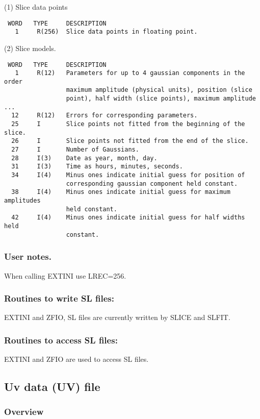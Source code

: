 (1) Slice data points

\begin{verbatim}
 WORD   TYPE     DESCRIPTION
   1     R(256)  Slice data points in floating point.
\end{verbatim}

(2) Slice models.

\begin{verbatim}
 WORD   TYPE     DESCRIPTION
   1     R(12)   Parameters for up to 4 gaussian components in the order
                 maximum amplitude (physical units), position (slice
                 point), half width (slice points), maximum amplitude ...
  12     R(12)   Errors for corresponding parameters.
  25     I       Slice points not fitted from the beginning of the slice.
  26     I       Slice points not fitted from the end of the slice.
  27     I       Number of Gaussians.
  28     I(3)    Date as year, month, day.
  31     I(3)    Time as hours, minutes, seconds.
  34     I(4)    Minus ones indicate initial guess for position of
                 corresponding gaussian component held constant.
  38     I(4)    Minus ones indicate initial guess for maximum amplitudes
                 held constant.
  42     I(4)    Minus ones indicate initial guess for half widths held
                 constant.
\end{verbatim}
\subsubsection{User notes.}
     When calling EXTINI use LREC=256.
 
 
\subsubsection{ Routines to write SL files:}
     EXTINI and ZFIO,  SL files are currently written by SLICE and SLFIT.
 
 
\subsubsection{Routines to access SL files:}
 EXTINI and ZFIO are used to access SL files.
 
\subsection{Uv data (UV) file}
\subsubsection{Overview}

